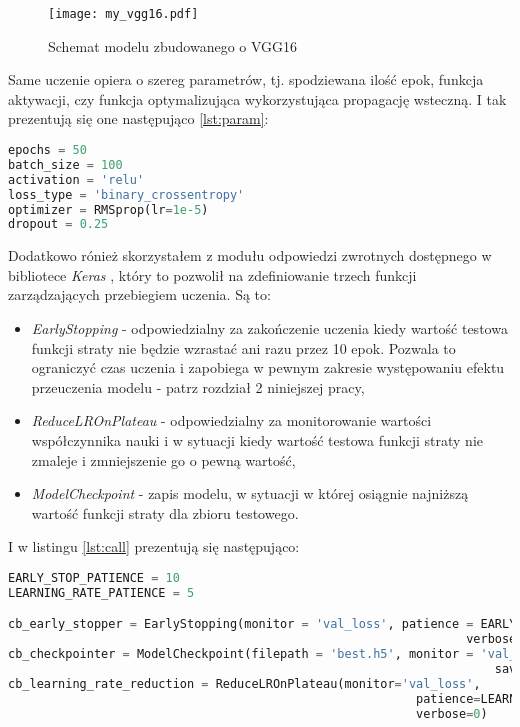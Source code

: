\begin{figure}[h!]
	\texttt{[image: my\_vgg16.pdf]}
	\centering
	\caption{Schemat modelu zbudowanego o VGG16}
	\label{fig:my_vgg16}
\end{figure}

Same uczenie opiera o szereg parametrów, tj. spodziewana ilość epok, funkcja aktywacji, czy funkcja optymalizująca wykorzystująca propagację wsteczną. I tak prezentują się one następująco \ref{lst:param}:

\begin{lstlisting}[language=Python, caption=Parametry pracy modelu VGG, captionpos=b, label={lst:param}]
epochs = 50
batch_size = 100
activation = 'relu'
loss_type = 'binary_crossentropy'
optimizer = RMSprop(lr=1e-5)
dropout = 0.25
\end{lstlisting}

Dodatkowo rónież skorzystałem z modułu odpowiedzi zwrotnych dostępnego w bibliotece \textit{Keras} \cite{keras}, który to pozwolił na zdefiniowanie trzech funkcji zarządzających przebiegiem uczenia. Są to:
\begin{itemize}
	\item \textit{EarlyStopping} - odpowiedzialny za zakończenie uczenia kiedy wartość testowa funkcji straty nie będzie wzrastać ani razu przez 10 epok. Pozwala to ograniczyć czas uczenia i zapobiega w pewnym zakresie występowaniu efektu przeuczenia modelu - patrz rozdział 2 niniejszej pracy,
	\item \textit{ReduceLROnPlateau} - odpowiedzialny za monitorowanie wartości współczynnika nauki i w sytuacji kiedy wartość testowa funkcji straty nie zmaleje i zmniejszenie go o pewną wartość,
	\item \textit{ModelCheckpoint} - zapis modelu, w sytuacji w której osiągnie najniższą wartość funkcji straty dla zbioru testowego.
\end{itemize}

I w listingu \ref{lst:call} prezentują się następująco:

\begin{lstlisting}[language=Python, caption=Funkcje sterujące procesem uczenia, captionpos=b, label={lst:call}]
EARLY_STOP_PATIENCE = 10
LEARNING_RATE_PATIENCE = 5

cb_early_stopper = EarlyStopping(monitor = 'val_loss', patience = EARLY_STOP_PATIENCE,
								 								verbose=0)
cb_checkpointer = ModelCheckpoint(filepath = 'best.h5', monitor = 'val_loss', 
																	save_best_only = True, verbose=0)
cb_learning_rate_reduction = ReduceLROnPlateau(monitor='val_loss', 
														 patience=LEARNING_RATE_PATIENCE, 
														 verbose=0)
\end{lstlisting}

